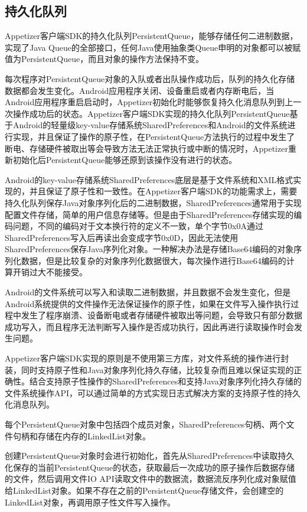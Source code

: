 \subsection{持久化队列}
\label{subsec:persistentQueue}

Appetizer客户端SDK的持久化队列PersistentQueue，能够存储任何二进制数据，实现了Java Queue的全部接口，任何Java使用抽象类Queue申明的对象都可以被赋值为PersistentQueue，而且对象的操作方法保持不变。

每次程序对PersistentQueue对象的入队或者出队操作成功后，队列的持久化存储数据都会发生变化。Android应用程序关闭、设备重启或者内存断电后，当Android应用程序重启启动时，Appetizer初始化时能够恢复持久化消息队列到上一次操作成功后的状态。Appetizer客户端SDK实现的持久化队列PersistentQueue基于Android的轻量级key-value存储系统SharedPreferences和Android的文件系统进行实现，并且保证了操作的原子性，在PersistentQueue方法执行的过程中发生了断电、存储硬件被取出等会导致方法无法正常执行或中断的情况时，Appetizer重新初始化后PersistentQueue能够还原到该操作没有进行的状态。

Android的key-value存储系统SharedPreferences底层是基于文件系统和XML格式实现的，并且保证了原子性和一致性。在Appetizer客户端SDK的功能需求上，需要持久化队列保存Java对象序列化后的二进制数据，SharedPreferences通常用于实现配置文件存储，简单的用户信息存储等。但是由于SharedPreferences存储实现的编码问题，不同的编码对于文本换行符的定义不一致，单个字节0x0A通过SharedPreferences写入后再读出会变成字节0x0D，因此无法使用SharedPreferences保存Java序列化对象。一种解决办法是存储Base64编码的对象序列化数据，但是比较复杂的对象序列化数据很大，每次操作进行Base64编码的计算开销过大不能接受。

Android的文件系统可以写入和读取二进制数据，并且数据不会发生变化，但是Android系统提供的文件操作无法保证操作的原子性，如果在文件写入操作执行过程中发生了程序崩溃、设备断电或者存储硬件被取出等问题，会导致只有部分数据成功写入，而且程序无法判断写入操作是否成功执行，因此再进行读取操作时会发生问题。

Appetizer客户端SDK实现的原则是不使用第三方库，对文件系统的操作进行封装，同时支持原子性和Java对象序列化持久存储，比较复杂而且难以保证实现的正确性。结合支持原子性操作的SharedPreferences和支持Java对象序列化持久存储的文件系统操作API，可以通过简单的方式实现日志式解决方案的支持原子性的持久化消息队列。

每个PersistentQueue对象中包括四个成员对象，SharedPreferences句柄、两个文件句柄和存储在内存的LinkedList对象。

创建PersistentQueue对象时会进行初始化，首先从SharedPreferences中读取持久化保存的当前PersistentQueue的状态，获取最后一次成功的原子操作后数据存储的文件，然后调用文件IO API读取文件中的数据流，数据流反序列化成对象赋值给LinkedList对象。如果不存在之前的PersistentQueue存储文件，会创建空的LinkedList对象，再调用原子性文件写入操作。

